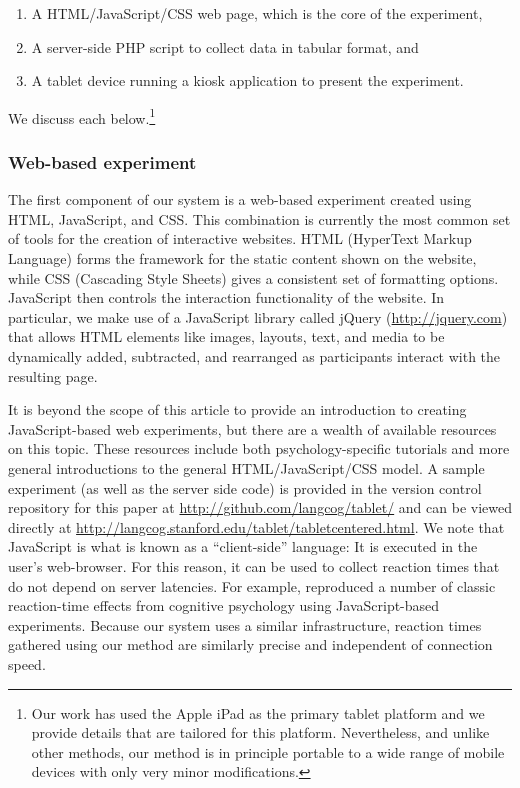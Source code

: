 \documentclass[man,noapacite]{apa2}
\begin{document}
\begin{enumerate}
\item A HTML/JavaScript/CSS web page, which is the core of the experiment, 
\item A server-side PHP script to collect data in tabular format, and
\item A tablet device running a kiosk application to present the experiment. 
\end{enumerate}

\noindent We discuss each below.\footnote{Our work has used the Apple iPad as the primary tablet platform and we provide details that are tailored for this platform. Nevertheless, and unlike other methods, our method is in principle portable to a wide range of mobile devices with only very minor modifications.}

\subsubsection{Web-based experiment}

The first component of our system is a web-based experiment created using HTML, JavaScript, and CSS. This combination is currently the most common set of tools for the creation of interactive websites. HTML (HyperText Markup Language) forms the framework for the static content shown on the website, while CSS (Cascading Style Sheets) gives a consistent set of formatting options. JavaScript then controls the interaction functionality of the website. In particular, we make use of a JavaScript library called jQuery (\url{http://jquery.com}) that allows HTML elements like images, layouts, text, and media to be dynamically added, subtracted, and rearranged as participants interact with the resulting page. 

It is beyond the scope of this article to provide an introduction to creating JavaScript-based web experiments, but there are a wealth of available resources on this topic. These resources include both psychology-specific tutorials and more general introductions to the general HTML/JavaScript/CSS model. A sample experiment (as well as the server side code) is provided in the version control repository for this paper  at \url{http://github.com/langcog/tablet/} and can be viewed directly at \url{http://langcog.stanford.edu/tablet/tabletcentered.html}. We note that JavaScript is what is known as a ``client-side'' language: It is executed in the user's web-browser. For this reason, it can be used to collect reaction times that do not depend on server latencies. For example,  reproduced a number of classic reaction-time effects from cognitive psychology using JavaScript-based experiments. Because our system uses a similar infrastructure, reaction times gathered using our method are similarly precise and independent of connection speed. 
\end{document}
